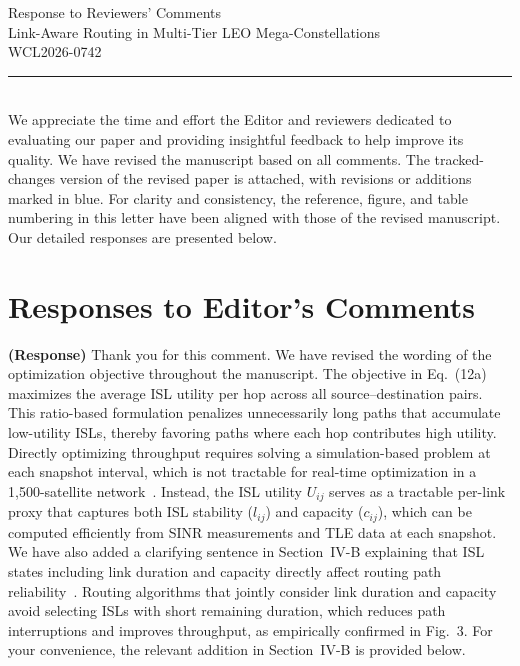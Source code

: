 \documentclass[letter]{article}
\begin{document}

{\bf\large
\begin{center}
Response to Reviewers' Comments\\
Link-Aware Routing in Multi-Tier LEO Mega-Constellations\\
WCL2026-0742
\end{center}
\vspace{-0.15cm}}
\noindent\rule{\textwidth}{0.5mm}\\
 We appreciate the time and effort the Editor and reviewers dedicated to evaluating our paper and providing insightful feedback to help improve its quality. We have revised the manuscript based on all comments. The tracked-changes version of the revised paper is attached, with revisions or additions marked in blue. For clarity and consistency, the reference, figure, and table numbering in this letter have been aligned with those of the revised manuscript. Our detailed responses are presented below.

\color{black}

\vspace{0.1cm} \noindent
\section*{\large Responses to Editor's Comments}

\noindent {}

\vspace{5mm}
{\bf (Response)}
Thank you for this comment. We have revised the wording of the optimization objective throughout the manuscript. The objective in Eq.~(12a) maximizes the average ISL utility per hop across all source--destination pairs. This ratio-based formulation penalizes unnecessarily long paths that accumulate low-utility ISLs, thereby favoring paths where each hop contributes high utility. Directly optimizing throughput requires solving a simulation-based problem at each snapshot interval, which is not tractable for real-time optimization in a 1,500-satellite network~\cite{guo2024lightweight}. Instead, the ISL utility $U_{ij}$ serves as a tractable per-link proxy that captures both ISL stability ($l_{ij}$) and capacity ($c_{ij}$), which can be computed efficiently from SINR measurements and TLE data at each snapshot. We have also added a clarifying sentence in Section~IV-B explaining that ISL states including link duration and capacity directly affect routing path reliability~\cite{han2023time}. Routing algorithms that jointly consider link duration and capacity avoid selecting ISLs with short remaining duration, which reduces path interruptions and improves throughput, as empirically confirmed in Fig.~3. For your convenience, the relevant addition in Section~IV-B is provided below.
\end{document}
